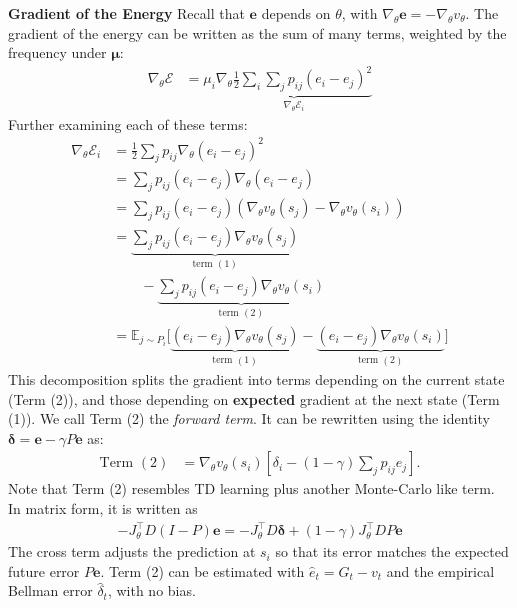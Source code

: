 \documentclass{article}
\theoremstyle{plain}
\theoremstyle{definition}
\theoremstyle{remark}
\begin{document}
\textbf{Gradient of the Energy}
Recall that $\bm{e}$ depends on $\theta$, with $\nabla_\theta \bm{e} = -\nabla_\theta v_\theta$. The gradient of the energy can be written as the sum of many terms, weighted by the frequency under $\bm{\mu}$:
  \begin{align}
  \nabla_\theta \mathcal{E} &=  \mu_i \underbrace{\nabla_\theta \frac{1}{2}\sum_{i} \sum_jp_{ij}
  (e_i - e_j)^2}_{\nabla_\theta \mathcal{E}_i}  \nonumber 
  \end{align}
Further examining each of these terms:
\begin{align}
   \nabla_\theta \mathcal{E}_i  &=  \frac{1}{2} \sum_jp_{ij} \nabla_\theta(e_i - e_j)^2 \nonumber \\
   &=   \sum_jp_{ij}
  (e_i - e_j)\nabla_\theta(e_i - e_j) \nonumber\\
    &=    \sum_jp_{ij}
  (e_i - e_j) (\nabla_\theta v_\theta(s_j) -\nabla_\theta v_\theta(s_i)) \nonumber \\
      &=    \underbrace{\sum_jp_{ij}
  (e_i - e_j) \nabla_\theta v_\theta(s_j)}_{\text{term } (1)} \nonumber \\ & \qquad - \underbrace{\sum_jp_{ij}
  (e_i - e_j) \nabla_\theta v_\theta(s_i) }_{\text{term } (2)} \\
    &=  \mathbb{E}_{j \sim P_i} \big[
  \underbrace{(e_i - e_j) \nabla_\theta v_\theta(s_j)}_{\text{term } (1)} - \underbrace{
  (e_i - e_j) \nabla_\theta v_\theta(s_i) }_{\text{term } (2)} \big]
\end{align}
This decomposition splits the gradient into terms depending on the current state (Term (2)), and those depending on \textbf{expected} gradient at the next state (Term (1)). We call Term (2) the \textit{forward term}. It can be rewritten using the identity $\bm{\delta} = \bm{e} - \gamma P \bm{e}$ as:
\begin{align}
\text{Term } (2) &= \nabla_\theta v_\theta(s_i) [\delta_i - (1-\gamma) \sum_j p_{ij} e_j].
\end{align}
Note that Term (2) resembles TD learning plus another Monte-Carlo like term. In matrix form, it is written as 
\begin{align}-J_\theta^\intercal D(I-P)\bm{e} = -J_\theta^\intercal D \bm{\delta } + (1-\gamma) J_\theta^\intercal D P \bm{e}\end{align}
The cross term adjusts the prediction at $s_i$ so that its error matches the expected future error $P\bm{e}$. Term (2) can be estimated with $\hat{e}_t = G_t - v_t$ and the empirical Bellman error $\hat{\delta}_t$, with no bias.
\end{document}
